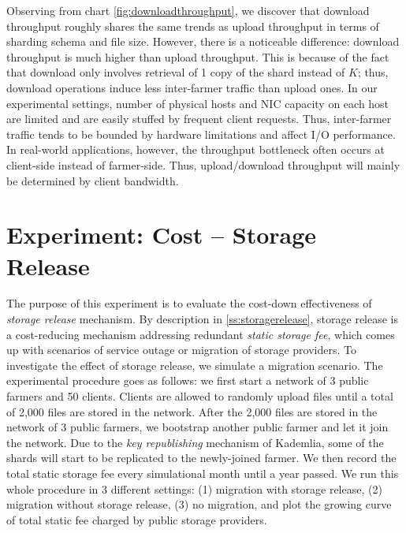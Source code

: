 Observing from chart \ref{fig:downloadthroughput}, we discover that download throughput roughly shares the same trends as upload throughput in terms of sharding schema and file size. However, there is a noticeable difference: download throughput is much higher than upload throughput. This is because of the fact that download only involves retrieval of 1 copy of the shard instead of $K$; thus, download operations induce less inter-farmer traffic than upload ones. In our experimental settings, number of physical hosts and NIC capacity on each host are limited and are easily stuffed by frequent client requests. Thus, inter-farmer traffic tends to be bounded by hardware limitations and affect I/O performance. In real-world applications, however, the throughput bottleneck often occurs at client-side instead of farmer-side. Thus, upload/download throughput will mainly be determined by client bandwidth.

\section{Experiment: Cost -- Storage Release}
\label{s:expcoststoragerelease}

The purpose of this experiment is to evaluate the cost-down effectiveness of \textit{storage release} mechanism. By description in \ref{ss:storagerelease}, storage release is a cost-reducing mechanism addressing redundant \textit{static storage fee}, which comes up with scenarios of service outage or migration of storage providers. To investigate the effect of storage release, we simulate a migration scenario. The experimental procedure goes as follows: we first start a network of 3 public farmers and 50 clients. Clients are allowed to randomly upload files until a total of 2,000 files are stored in the network. After the 2,000 files are stored in the network of 3 public farmers, we bootstrap another public farmer and let it join the network. Due to the \textit{key republishing} mechanism of Kademlia, some of the shards will start to be replicated to the newly-joined farmer. We then record the total static storage fee every simulational month until a year passed. We run this whole procedure in 3 different settings: (1) migration with storage release, (2) migration without storage release, (3) no migration, and plot the growing curve of total static fee charged by public storage providers.

